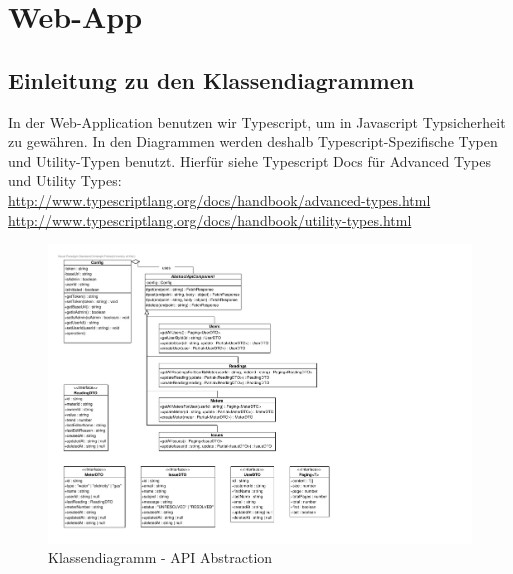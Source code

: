 \section{Web-App}
\subsection{Einleitung zu den Klassendiagrammen}
In der Web-Application benutzen wir Typescript, um in Javascript Typsicherheit zu gewähren. In den Diagrammen werden deshalb Typescript-Spezifische Typen und Utility-Typen benutzt. Hierfür siehe Typescript Docs für Advanced Types und Utility Types: \\
\url{http://www.typescriptlang.org/docs/handbook/advanced-types.html} \\
\url{http://www.typescriptlang.org/docs/handbook/utility-types.html}

\begin{figure}[H]
	\hspace{-3cm}
	\includegraphics[scale = 0.9]{./img/diagrams/api-classDiagram}
	\caption{Klassendiagramm - API Abstraction}
\end{figure}
\newpage

